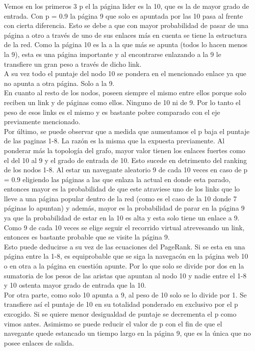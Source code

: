 Vemos en los primeros 3 p el la página lider es la 10, que es la de mayor grado de entrada. Con p = 0.9 la página 9 que solo es apuntada por las 10 pasa al frente con cierta diferencia. Esto se debe a que con mayor probabilidad de pasar de una página a otro a través de uno de sus enlaces más en cuenta se tiene la estructura de la red. Como la página 10 es la a la que más se apunta (todos lo hacen menos la 9), esta es una página importante y al encontrarse enlazando a la 9 le transfiere un gran peso a través de dicho link. \\

A su vez todo el puntaje del nodo 10 se pondera en el mencionado enlace ya que no apunta a otra página. Solo a la 9. \\
En cuanto al resto de los nodos, poseen siempre el mismo entre ellos porque solo reciben un link y de páginas como ellos. Ninguno de 10 ni de 9. Por lo tanto el peso de esos links es el mismo y es bastante pobre comparado con el eje previamente mencionado. \\

Por último, se puede observar que a medida que aumentamos el p baja el puntaje de las paginas 1-8. La razón es la misma que la expuesta previamente. Al ponderar más la topología del grafo, mayor valor tienen los enlaces fuertes como el del 10 al 9 y el grado de entrada de 10. Esto sucede en detrimento del ranking de los nodos 1-8. Al estar un navegante aleatorio 9 de cada 10 veces en caso de p = 0.9 eligiendo las páginas a las que enlaza la actual en donde esta parado, entonces mayor es la probabilidad de que este atraviese uno de los links que lo lleve a una página popular dentro de la red (como es el caso de la 10 donde 7 páginas lo apuntan) y además, mayor es la probabilidad de parar en la página 9 ya que la probabilidad de estar en la 10 es alta y esta solo tiene un enlace a 9. Como 9 de cada 10 veces se elige seguir el recorrido virtual atrevesando un link, entonces es bastante probable que se visite la página 9. \\

Esto puede deducirse a su vez de las ecuaciones del PageRank. Si se esta en una página entre la 1-8, es equiprobable que se siga la navegacón en la página web 10 o en otra a la página en cuestión apunte. Por lo que solo se divide por dos en la sumatoria de los pesos de las aristas que apuntan al nodo 10 y nadie entre el 1-8 y 10 ostenta mayor grado de entrada que la 10. \\

Por otra parte, como solo 10 apunta a 9, al peso de 10 solo se lo divide por 1. Se transfiere así el puntaje de 10 en su totalidad ponderado en exclusivo por el p excogido. Si se quiere menor desigualdad de puntaje se decrementa el p como vimos antes. Asimismo se puede reducir el valor de p con el fin de que el navegante quede estancado un tiempo largo en la página 9, que es la única que no posee enlaces de salida. \\

